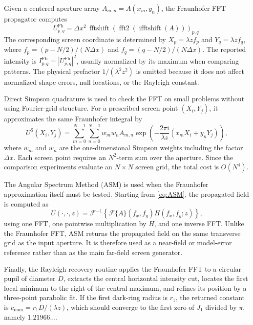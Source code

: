 \documentclass[12pt]{article}
\begin{document}
Given a centered aperture array \(A_{m,n}=A(x_m,y_n)\), the Fraunhofer FFT propagator computes
\[
    U^{\mathrm{Fh}}_{p,q}
    =
    \Delta x^2\,
    \operatorname{fftshift}\!\left(
        \operatorname{fft2}\!\left(\operatorname{ifftshift}(A)\right)
    \right)_{p,q}.
\]
The corresponding screen coordinate is determined by \(X_p=\lambda z f_p\) and \(Y_q=\lambda z f_q\),
where \(f_p=(p-N/2)/(N\Delta x)\) and \(f_q=(q-N/2)/(N\Delta x)\). The reported intensity is
\(I^{\mathrm{Fh}}_{p,q}=|U^{\mathrm{Fh}}_{p,q}|^2\), usually normalized by its maximum when comparing
patterns. The physical prefactor \(1/(\lambda^2z^2)\) is omitted because it does not affect normalized
shape errors, null locations, or the Rayleigh constant.

Direct Simpson quadrature is used to check the FFT on small problems without using Fourier-grid structure.
For a prescribed screen point \((X_i,Y_j)\), it approximates the same Fraunhofer integral by
\[
    U^{\mathrm{S}}(X_i,Y_j)
    =
    \sum_{m=0}^{N-1}\sum_{n=0}^{N-1}
    w_m w_n A_{m,n}
    \exp\!\left(
        -\frac{2\pi\mathrm{i}}{\lambda z}(x_mX_i+y_nY_j)
    \right),
\]
where \(w_m\) and \(w_n\) are the one-dimensional Simpson weights including the factor \(\Delta x\). Each
screen point requires an \(N^2\)-term sum over the aperture. Since the comparison experiments evaluate an
\(N\times N\) screen grid, the total cost is \(O(N^4)\).

The Angular Spectrum Method (ASM) is used when the Fraunhofer approximation itself must be tested. Starting
from \eqref{eq:ASM}, the propagated field is computed as
\[
    U(\cdot,\cdot,z)
    =
    \mathcal{F}^{-1}
    \left\{
        \mathcal{F}\{A\}(f_x,f_y)H(f_x,f_y;z)
    \right\},
\]
using one FFT, one pointwise multiplication by \(H\), and one inverse FFT. Unlike the Fraunhofer FFT, ASM
returns the propagated field on the same transverse grid as the input aperture. It is therefore used as a
near-field or model-error reference rather than as the main far-field screen generator.

Finally, the Rayleigh recovery routine applies the Fraunhofer FFT to a circular pupil of diameter \(D\),
extracts the central horizontal intensity cut, locates the first local minimum to the right of the central
maximum, and refines its position by a three-point parabolic fit. If the first dark-ring radius is \(r_1\),
the returned constant is \(c_{\mathrm{num}}=r_1D/(\lambda z)\), which should converge to the first zero of
\(J_1\) divided by \(\pi\), namely \(1.21966\ldots\).
\end{document}
